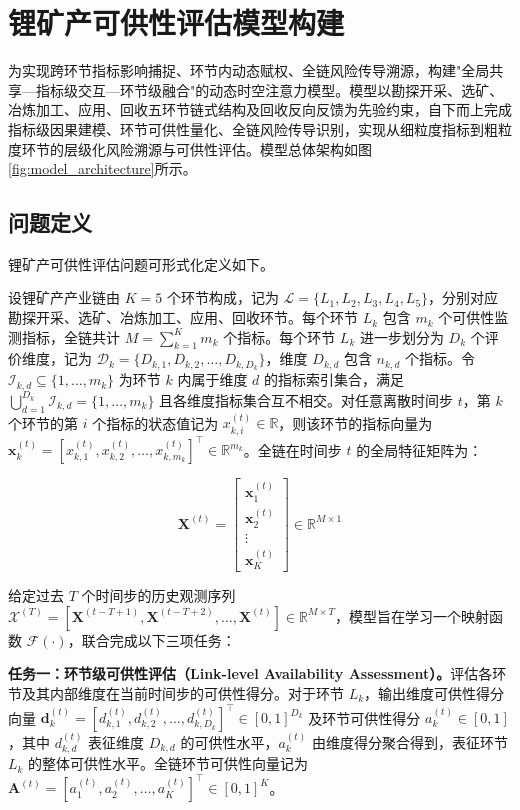 \section{锂矿产可供性评估模型构建}

为实现跨环节指标影响捕捉、环节内动态赋权、全链风险传导溯源，构建"全局共享—指标级交互—环节级融合"的动态时空注意力模型。模型以勘探开采、选矿、冶炼加工、应用、回收五环节链式结构及回收反向反馈为先验约束，自下而上完成指标级因果建模、环节可供性量化、全链风险传导识别，实现从细粒度指标到粗粒度环节的层级化风险溯源与可供性评估。模型总体架构如图\ref{fig:model_architecture}所示。

\subsection{问题定义}

锂矿产可供性评估问题可形式化定义如下。

设锂矿产产业链由 $K=5$ 个环节构成，记为 $\mathcal{L}=\{L_1,L_2,L_3,L_4,L_5\}$，分别对应勘探开采、选矿、冶炼加工、应用、回收环节。每个环节 $L_k$ 包含 $m_k$ 个可供性监测指标，全链共计 $M=\sum_{k=1}^{K} m_k$ 个指标。每个环节 $L_k$ 进一步划分为 $D_k$ 个评价维度，记为 $\mathcal{D}_k=\{D_{k,1},D_{k,2},\ldots,D_{k,D_k}\}$，维度 $D_{k,d}$ 包含 $n_{k,d}$ 个指标。令 $\mathcal{I}_{k,d}\subseteq\{1,\ldots,m_k\}$ 为环节 $k$ 内属于维度 $d$ 的指标索引集合，满足 $\bigcup_{d=1}^{D_k}\mathcal{I}_{k,d}=\{1,\ldots,m_k\}$ 且各维度指标集合互不相交。对任意离散时间步 $t$，第 $k$ 个环节的第 $i$ 个指标的状态值记为 $x_{k,i}^{(t)}\in\mathbb{R}$，则该环节的指标向量为 $\mathbf{x}_k^{(t)}=[x_{k,1}^{(t)},x_{k,2}^{(t)},\ldots,x_{k,m_k}^{(t)}]^{\top}\in\mathbb{R}^{m_k}$。全链在时间步 $t$ 的全局特征矩阵为：

\begin{equation}
\mathbf{X}^{(t)}=\begin{bmatrix}
\mathbf{x}_1^{(t)} \\
\mathbf{x}_2^{(t)} \\
\vdots \\
\mathbf{x}_K^{(t)}
\end{bmatrix}\in\mathbb{R}^{M\times 1}
\end{equation}

给定过去 $T$ 个时间步的历史观测序列 $\mathcal{X}^{(T)}=[\mathbf{X}^{(t-T+1)},\mathbf{X}^{(t-T+2)},\ldots,\mathbf{X}^{(t)}]\in\mathbb{R}^{M\times T}$，模型旨在学习一个映射函数 $\mathcal{F}(\cdot)$，联合完成以下三项任务：

\textbf{任务一：环节级可供性评估（Link-level Availability Assessment）。}评估各环节及其内部维度在当前时间步的可供性得分。对于环节 $L_k$，输出维度可供性得分向量 $\mathbf{d}_k^{(t)}=[d_{k,1}^{(t)},d_{k,2}^{(t)},\ldots,d_{k,D_k}^{(t)}]^{\top}\in[0,1]^{D_k}$ 及环节可供性得分 $a_k^{(t)}\in[0,1]$，其中 $d_{k,d}^{(t)}$ 表征维度 $D_{k,d}$ 的可供性水平，$a_k^{(t)}$ 由维度得分聚合得到，表征环节 $L_k$ 的整体可供性水平。全链环节可供性向量记为 $\mathbf{A}^{(t)}=[a_1^{(t)},a_2^{(t)},\ldots,a_K^{(t)}]^{\top}\in[0,1]^{K}$。

